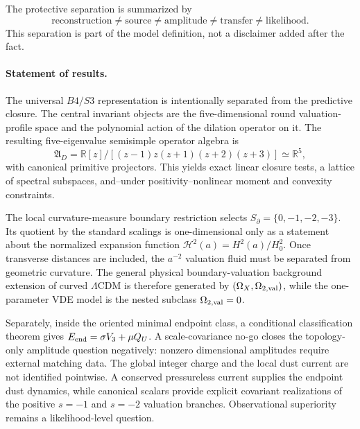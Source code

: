 \documentclass[11pt,a4paper]{article}
\def\Bfour{B4}%
\def\Sthree{S3}%
\def\Dil{D}%
\def\QU{Q_U}%
\numberwithin{equation}{section}
\theoremstyle{definition}
\theoremstyle{plain}
\theoremstyle{remark}
\newcommand{\Sthree}{S^3}
\newcommand{\Bfour}{B^4}
\newcommand{\Dil}{\mathscr{D}}
\newcommand{\QU}{Q_U}
\begin{document}
The protective separation is summarized by
\begin{equation}
\boxed{
\text{reconstruction}
\neq\text{source}
\neq\text{amplitude}
\neq\text{transfer}
\neq\text{likelihood}.
}
\end{equation}
This separation is part of the model definition, not a disclaimer added after the fact.

\paragraph{Statement of results.}
The universal \(\Bfour/\Sthree\) representation is intentionally separated from the predictive closure. The central invariant objects are the five-dimensional round valuation-profile space and the polynomial action of the dilation operator on it. The resulting five-eigenvalue semisimple operator algebra is
\begin{equation}
\mathfrak A_{\Dil}
=\mathbb R[z]/[(z-1)z(z+1)(z+2)(z+3)]
\simeq\mathbb R^5,
\end{equation}
with canonical primitive projectors. This yields exact linear closure tests, a lattice of spectral subspaces, and--under positivity--nonlinear moment and convexity constraints.

The local curvature-measure boundary restriction selects \(S_\partial=\{0,-1,-2,-3\}\). Its quotient by the standard scalings is one-dimensional only as a statement about the normalized expansion function \(\mathcal H^2(a)=H^2(a)/H_0^2\). Once transverse distances are included, the \(a^{-2}\) valuation fluid must be separated from geometric curvature. The general physical boundary-valuation background extension of curved \(\Lambda\)CDM is therefore generated by \((\Omega_X,\Omega_{2,\rm val})\), while the one-parameter VDE model is the nested subclass \(\Omega_{2,\rm val}=0\).

Separately, inside the oriented minimal endpoint class, a conditional classification theorem gives \(E_{\rm end}=\sigma V_3+\mu\QU\). A scale-covariance no-go closes the topology-only amplitude question negatively: nonzero dimensional amplitudes require external matching data. The global integer charge and the local dust current are not identified pointwise. A conserved pressureless current supplies the endpoint dust dynamics, while canonical scalars provide explicit covariant realizations of the positive \(s=-1\) and \(s=-2\) valuation branches. Observational superiority remains a likelihood-level question.
\end{document}
